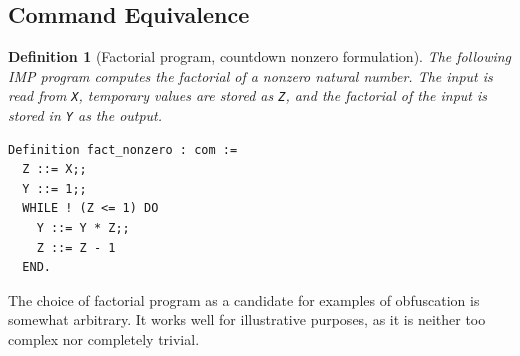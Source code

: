 \documentclass[compsoc,conference,a4paper,10pt,times]{IEEEtran}
\newtheorem{defin}[theorem]{Definition}
\begin{document}

\subsection{Command Equivalence}\label{naive}
\begin{defin}[Factorial program, countdown nonzero formulation]\label{Fact}
    The following IMP program computes the factorial of a nonzero natural number.  The input is read from \texttt{X}, temporary values are stored as \texttt{Z}, and the factorial of the input is stored in \texttt{Y} as the output.
\begin{verbatim}
Definition fact_nonzero : com :=
  Z ::= X;;
  Y ::= 1;;
  WHILE ! (Z <= 1) DO
    Y ::= Y * Z;;
    Z ::= Z - 1
  END.
\end{verbatim}
\end{defin}
%
    The choice of factorial program as a candidate for examples of obfuscation is somewhat arbitrary.  It works well for illustrative purposes, as it is neither too complex nor completely trivial.
\end{document}
